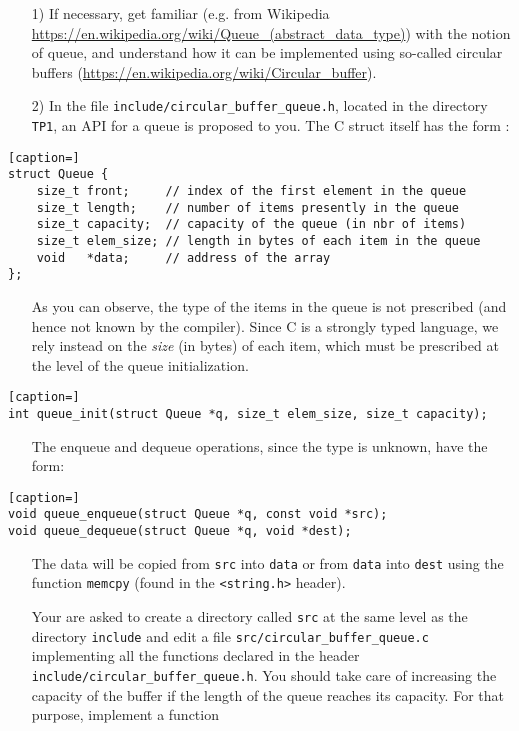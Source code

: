 \documentclass[a4paper,12pt]{article}
\begin{document}
\begin{enumerate}
	\item[1)] If necessary, get familiar (e.g. from Wikipedia  \url{https://en.wikipedia.org/wiki/Queue_(abstract_data_type)}) with the notion of queue, and understand how it can be implemented using so-called circular buffers (\url{https://en.wikipedia.org/wiki/Circular_buffer}).

	\item[2)] In the file {\tt include/circular\_buffer\_queue.h}, located in the directory {\tt TP1}, an API for a queue is proposed to you. The C struct itself has the form :
\end{enumerate}
\begin{lstlisting}[caption=]
struct Queue {
	size_t front;     // index of the first element in the queue
	size_t length;    // number of items presently in the queue
	size_t capacity;  // capacity of the queue (in nbr of items)
	size_t elem_size; // length in bytes of each item in the queue
	void   *data;     // address of the array
};
\end{lstlisting}
\begin{enumerate}
\item[] As you can observe, the type of the items in the queue is not prescribed (and hence not known by the compiler). Since C is a strongly typed language, we rely instead on the {\it size} (in bytes) of each item, which must be prescribed at the level of the queue initialization.
\end{enumerate}
\begin{lstlisting}[caption=]
int queue_init(struct Queue *q, size_t elem_size, size_t capacity);
\end{lstlisting}
\begin{enumerate}
\item[] The enqueue and dequeue operations, since the type is unknown, have the form:
\end{enumerate}
\begin{lstlisting}[caption=]
void queue_enqueue(struct Queue *q, const void *src);
void queue_dequeue(struct Queue *q, void *dest);
\end{lstlisting}
\begin{enumerate}
	\item[] The data will be copied from {\tt src} into {\tt data} or from {\tt data} into {\tt dest} using the function {\tt memcpy} (found in the {\tt <string.h>} header).

Your are asked to create a directory called {\tt src} at the same level as the directory {\tt include} and edit a file {\tt src/circular\_buffer\_queue.c} implementing all the functions declared in the header 
{\tt include/circular\_buffer\_queue.h}. You should take care of increasing the capacity of the buffer if the length of the queue reaches its capacity. For that purpose, implement a function 
\end{enumerate}
\end{document}
